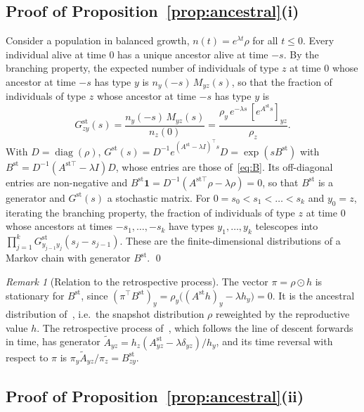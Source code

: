 \documentclass[a4paper, 11pt]{article}
\DeclareMathOperator{\diag}{diag}
\theoremstyle{plain}
\theoremstyle{remark}
\newtheorem{rem}{Remark}
\begin{document}
\subsection{Proof of Proposition~\ref{prop:ancestral}(i)}

Consider a population in balanced growth, $n(t) = e^{\lambda t}\rho$ for all $t \leq 0$. Every individual alive at time $0$ has a unique ancestor alive at time $-s$. By the branching property, the expected number of individuals of type $z$ at time $0$ whose ancestor at time $-s$ has type $y$ is $n_y(-s)\,M_{yz}(s)$, so that the fraction of individuals of type $z$ whose ancestor at time $-s$ has type $y$ is
\[
G^{\mathrm{st}}_{zy}(s) = \frac{n_y(-s)\,M_{yz}(s)}{n_z(0)} = \frac{\rho_y\,e^{-\lambda s}\,[e^{A^{\mathrm{st}}s}]_{yz}}{\rho_z}.
\]
With $D = \diag(\rho)$, $G^{\mathrm{st}}(s) = D^{-1}e^{(A^{\mathrm{st}}-\lambda I)^\top s}D = \exp(sB^{\mathrm{st}})$ with $B^{\mathrm{st}} = D^{-1}(A^{{\mathrm{st}}\top} - \lambda I)D$, whose entries are those of~\eqref{eq:B}. Its off-diagonal entries are non-negative and $B^{\mathrm{st}}\mathbf{1} = D^{-1}(A^{{\mathrm{st}}\top}\rho - \lambda\rho) = 0$, so that $B^{\mathrm{st}}$ is a generator and $G^{\mathrm{st}}(s)$ a stochastic matrix. For $0 = s_0 < s_1 < \dots < s_k$ and $y_0 = z$, iterating the branching property, the fraction of individuals of type $z$ at time $0$ whose ancestors at times $-s_1, \dots, -s_k$ have types $y_1, \dots, y_k$ telescopes into $\prod_{j=1}^k G^{\mathrm{st}}_{y_{j-1}y_j}(s_j - s_{j-1})$. These are the finite-dimensional distributions of a Markov chain with generator $B^{\mathrm{st}}$. \qed

\begin{rem}[Relation to the retrospective process]\label{rem:retro}
The vector $\pi = \rho \odot h$ is stationary for $B^{\mathrm{st}}$, since $(\pi^\top B^{\mathrm{st}})_y = \rho_y\bigl((A^{\mathrm{st}}h)_y - \lambda h_y\bigr) = 0$. It is the ancestral distribution of~\cite{jagers1996asymptotic, georgii2003ancestral}, i.e.\ the snapshot distribution $\rho$ reweighted by the reproductive value $h$. The retrospective process of~\cite{georgii2003ancestral}, which follows the line of descent forwards in time, has generator $\tilde A_{yz} = h_z(A^{\mathrm{st}}_{yz} - \lambda\delta_{yz})/h_y$, and its time reversal with respect to $\pi$ is $\pi_y \tilde A_{yz}/\pi_z = B^{\mathrm{st}}_{zy}$.
\end{rem}

\subsection{Proof of Proposition~\ref{prop:ancestral}(ii)}
\end{document}
